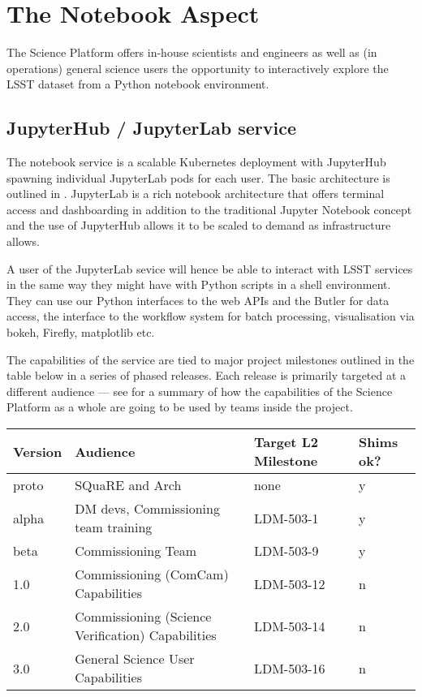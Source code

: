 \section{The Notebook Aspect}\label{notebook-aspect}

The Science Platform offers in-house scientists and engineers as well as (in operations) general science users the opportunity to interactively explore the LSST dataset from a Python notebook environment.

\subsection{JupyterHub / JupyterLab service}\label{jupyterhub-jupyterlab-service}

The notebook service is a scalable Kubernetes deployment with JupyterHub spawning individual JupyterLab pods for each user. The basic architecture is outlined in .
JupyterLab is a rich notebook architecture that offers terminal access and dashboarding in addition to the traditional Jupyter Notebook concept and the use of JupyterHub allows it to be scaled to demand as infrastructure allows.

A user of the JupyterLab sevice will hence be able to interact with LSST services in the same way they might have with Python scripts in a shell environment.
They can use our Python interfaces to the web APIs and the Butler for data access, the interface to the workflow system for batch processing, visualisation via bokeh, Firefly, matplotlib etc.

The capabilities of the service are tied to major project milestones outlined in the table below in a series of phased releases.  Each release is primarily targeted at a different audience --- see  for a summary of how the capabilities of the Science Platform as a whole are going to be used by teams inside the project.

\begin{footnotesize}
\begin{longtable}[c]{|l|l|l|l|}
\toprule
Version & Audience & Target L2 Milestone & Shims ok?\tabularnewline
\midrule
\endhead
proto & SQuaRE and Arch & none & y\tabularnewline
alpha & DM devs, Commissioning team training & LDM-503-1 &
y\tabularnewline
beta & Commissioning Team & LDM-503-9 & y\tabularnewline
1.0 & Commissioning (ComCam) Capabilities & LDM-503-12 &
n\tabularnewline
2.0 & Commissioning (Science Verification) Capabilities & LDM-503-14 & n\tabularnewline
3.0 & General Science User Capabilities & LDM-503-16 & n\tabularnewline
\bottomrule
\end{longtable}
\end{footnotesize}

